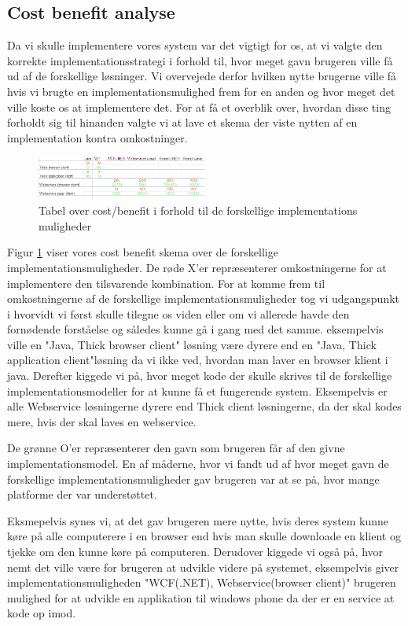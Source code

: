 \subsection{Cost benefit analyse}
\label{Cost_Ben}
Da vi skulle implementere vores system var det vigtigt for os, at vi valgte den korrekte implementationsstrategi i forhold til, hvor meget gavn brugeren ville få ud af de forskellige løsninger. Vi overvejede derfor hvilken nytte brugerne ville få hvis vi brugte en implementationsmulighed frem for en anden og hvor meget det ville koste os at implementere det. For at få et overblik over, hvordan disse ting forholdt sig til hinanden valgte vi at lave et skema der viste nytten af en implementation kontra omkostninger.

\begin{figure}[h!]
  \centering
    \includegraphics[width=0.5\textwidth]{Appendix/GUI-Prototype/CostBenefit}
  \caption{Tabel over cost/benefit i forhold til de forskellige implementations muligheder}
\label{Cost_Ben}
\end{figure} 

Figur \ref{Cost_Ben} viser vores cost benefit skema over de forskellige implementationsmuligheder. De røde X'er repræsenterer omkostningerne for at implementere den tilsvarende kombination. For at komme frem til omkostningerne af de forskellige implementationsmuligheder tog vi udgangspunkt i hvorvidt vi først skulle tilegne os viden eller om vi allerede havde den fornødende forståelse og således kunne gå i gang med det samme. eksempelvis ville en "Java, Thick browser client" løsning være dyrere end en "Java, Thick application client"løsning da vi ikke ved, hvordan man laver en browser klient i java. Derefter kiggede vi på, hvor meget kode der skulle skrives til de forskellige implementationsmodeller for at kunne få et fungerende system. Eksempelvis er alle Webservice løsningerne dyrere end Thick client løsningerne, da der skal kodes mere, hvis der skal laves en webservice.


De grønne O'er repræsenterer den gavn som brugeren får af den givne implementationsmodel. En af måderne, hvor vi fandt ud af hvor meget gavn de forskellige implementationsmuligheder gav brugeren var at se på, hvor mange platforme der var understøttet.

Eksmepelvis synes vi, at det gav brugeren mere nytte, hvis deres system kunne køre på alle computerere i en browser end hvis man skulle downloade en klient og tjekke om den kunne køre på computeren. Derudover kiggede vi også på, hvor nemt det ville være for brugeren at udvikle videre på systemet, eksempelvis giver implementationsmuligheden "WCF(.NET), Webservice(browser client)" brugeren mulighed for at udvikle en applikation til windows phone da der er en service at kode op imod.

